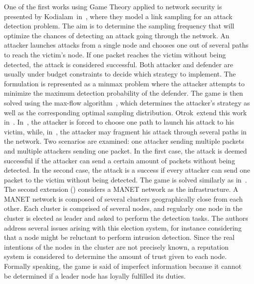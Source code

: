  One of the first works using Game Theory applied to network security is presented by Kodialam~\etal in~\cite{MuraliKodialam2003}, where they model a link sampling for an attack detection problem.
 The aim is to determine the sampling frequency that will optimize the chances of detecting an attack going through the network.
 An attacker launches attacks from a single node and chooses one out of several paths to reach the victim's node.
 If one packet reaches the victim without being detected, the attack is considered successful.
 Both attacker and defender are usually under budget constraints to decide which strategy to implement.
 The formulation is represented as a minmax problem where the attacker attempts to minimize the maximum detection probability of the defender.
 The game is then solved using the max-flow algorithm~\cite{maxflow}, which determines the attacker's strategy as well as the corresponding optimal sampling distribution.
 Otrok~\etal extend this work in~\cite{otrok1,otrok2}.
 In~\cite{MuraliKodialam2003}, the attacker is forced to choose one path to launch his attack to his victim, while, in~\cite{otrok1}, the attacker may fragment his attack through several paths in the network.
 Two scenarios are examined: one attacker sending multiple packets and multiple attackers sending one packet.
 In the first case, the attack is deemed successful if the attacker can send a certain amount of packets without being detected.
 In the second case, the attack is a success if every attacker can send one packet to the victim without being detected.
 The game is solved similarly as in~\cite{MuraliKodialam2003}.
 The second extension (\cite{otrok2}) considers a MANET network as the infrastructure.
 A MANET network is composed of several clusters geographically close from each other.
 Each cluster is comprised of several nodes, and regularly one node in the cluster is elected as leader and asked to perform the detection tasks. The authors address several issues arising with this election system, for instance considering that a node might be reluctant to perform intrusion detection.
 Since the real intentions of the nodes in the cluster are not precisely known, a reputation system is considered to determine the amount of trust given to each node.
 Formally speaking, the game is said of imperfect information because it cannot be determined if a leader node has loyally fulfilled its duties.
 
